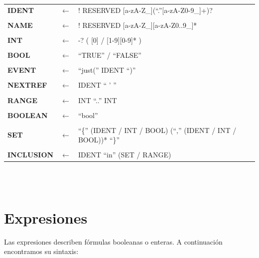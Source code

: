 \documentclass[titlepage, 12pt]{book}
\begin{document}
~\\\\
\begin{tabularx}{\textwidth}{>{\bfseries}llX}
IDENT & $\longleftarrow$ & ! RESERVED [a-zA-Z\_](``.''[a-zA-Z0-9\_]+)?\\\\
NAME & $\longleftarrow$ & ! RESERVED [a-zA-Z\_][a-zA-Z0..9\_]*\\\\
INT & $\longleftarrow$ & -? ( [0] / [1-9][0-9]* )\\\\
BOOL & $\longleftarrow$ & ``TRUE'' / ``FALSE''\\\\
EVENT & $\longleftarrow$ & ``just('' IDENT ``)''\\\\
NEXTREF & $\longleftarrow$ & IDENT `` ' ''\\\\
RANGE & $\longleftarrow$ & INT ``..'' INT\\\\
BOOLEAN & $\longleftarrow$ & ``bool''\\\\
SET & $\longleftarrow$ & ``\{'' (IDENT / INT / BOOL) (``,'' (IDENT / INT / BOOL))* ``\}''\\\\
INCLUSION & $\longleftarrow$ & IDENT ``in'' (SET / RANGE)\\
\end{tabularx}
~\\\\

\section{Expresiones}
Las expresiones describen f\'ormulas booleanas o enteras. A continuaci\'on encontramos su sintaxis:
\end{document}
